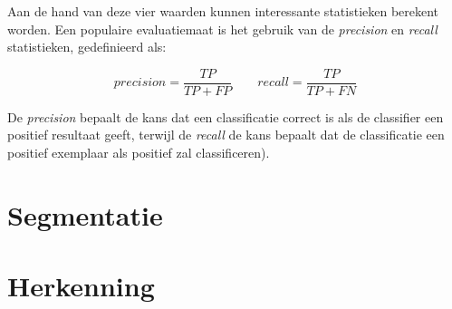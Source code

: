 Aan de hand van deze vier waarden kunnen interessante statistieken berekent worden. Een populaire evaluatiemaat is het gebruik van de \textit{precision} en \textit{recall} statistieken, gedefinieerd als:

$$precision = \frac{TP}{TP + FP} \qquad recall = \frac{TP}{TP + FN}$$

De \textit{precision} bepaalt de kans dat een classificatie correct is als de classifier een positief resultaat geeft, terwijl de \textit{recall} de kans bepaalt dat de classificatie een positief exemplaar als positief zal classificeren).



\section{Segmentatie}



\section{Herkenning}